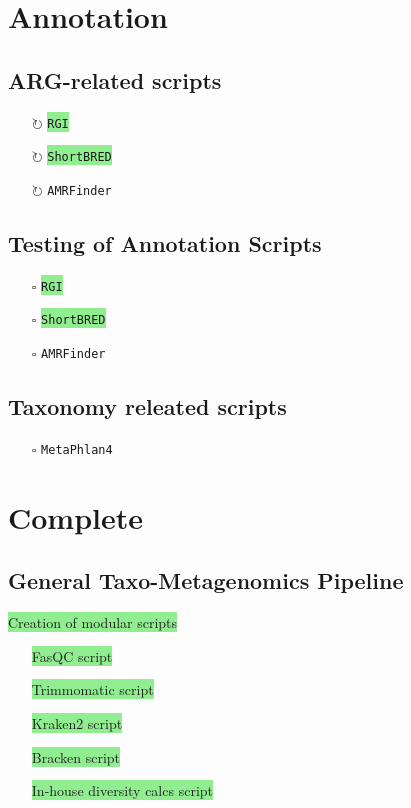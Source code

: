 \documentclass[11pt]{report}
\newcommand{\done}{\checkmark}
\newcommand{\pending}{$\square$}
\newcommand{\refine}{$\circlearrowright$}
\newcommand{\highlightessential}[1]{\colorbox{lightgreen}{#1}}
\newcommand{\highlightoptional}[1]{\colorbox{lightorange}{#1}}
\begin{document}
\begin{multicols}{2}
		\section*{Annotation}
		\subsection*{ARG-related scripts}
		\begin{itemize}
\item [\refine] \highlightessential{\texttt{RGI}}
\item [\refine] \highlightessential{\texttt{ShortBRED}}
\item [\refine] \highlightoptional{\texttt{AMRFinder}}
		\end{itemize}
\subsection*{Testing of Annotation Scripts}
\begin{itemize}
\item [\pending] \highlightessential{\texttt{RGI}}
\item [\pending] \highlightessential{\texttt{ShortBRED}}
\item [\pending] \highlightoptional{\texttt{AMRFinder}}
\end{itemize}
			
\subsection*{Taxonomy releated scripts}
\begin{itemize}
	\item [\pending] \highlightoptional{\texttt{MetaPhlan4}}
\end{itemize}
		

\section*{Complete}

\subsection*{General Taxo-Metagenomics Pipeline}

\highlightessential{Creation of modular scripts}
\begin{itemize}
	\item [\done] \highlightessential{FasQC script}
	\item [\done] \highlightessential{Trimmomatic script}
	\item [\done] \highlightessential{Kraken2 script}
	\item [\done] \highlightessential{Bracken script}
	\item [\done] \highlightessential{In-house diversity calcs script}
\end{itemize}


\end{multicols}
\end{document}
